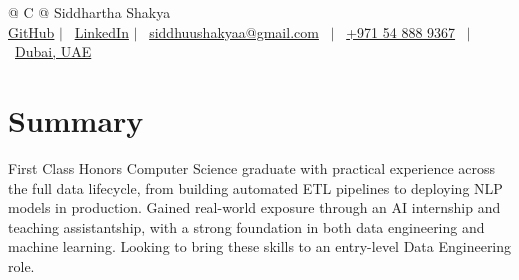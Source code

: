 \documentclass[a4paper,11pt]{article}
\begin{document}
\pagestyle{empty} 



\begin{tabularx}{\linewidth}{@{} C @{}} 
\Huge{Siddhartha Shakya} \\[3pt]
\href{https://github.com/SiddhuShkya}{GitHub} $|$ \ 
\href{https://www.linkedin.com/in/sidShkya/}{LinkedIn} $|$ \
\href{mailto:siddhuushakyaa@gmail.com}{siddhuushakyaa@gmail.com} \ $|$ \ 
\href{tel:+971548889367}{+971 54 888 9367} \ $|$ \ 
\href{https://maps.google.com/?q=International+City,+Dubai}{Dubai, UAE} \\
\end{tabularx}


\section{Summary}
First Class Honors Computer Science graduate with practical experience across the full data lifecycle, from building automated ETL pipelines to deploying NLP models in production. Gained real-world exposure through an
AI internship and teaching assistantship, with a strong foundation in both data engineering and machine
learning. Looking to bring these skills to an entry-level Data Engineering role.

\end{document}
